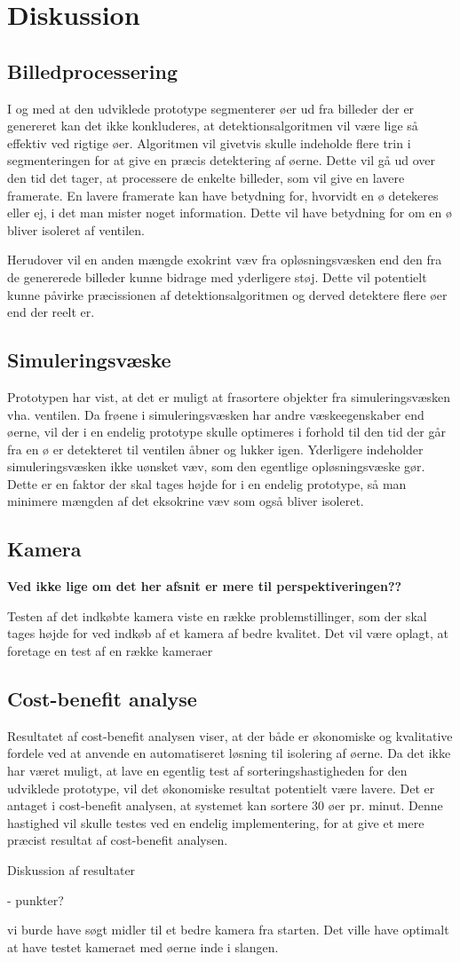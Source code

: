 \chapter{Diskussion}

\section{Billedprocessering}
I og med at den udviklede prototype segmenterer øer ud fra billeder der er genereret kan det ikke konkluderes, at detektionsalgoritmen vil være lige så effektiv ved rigtige øer. Algoritmen vil givetvis skulle indeholde flere trin i segmenteringen for at give en præcis detektering af øerne. Dette vil gå ud over den tid det tager, at processere de enkelte billeder, som vil give en lavere framerate. En lavere framerate kan have betydning for, hvorvidt en ø detekeres eller ej, i det man mister noget information. Dette vil have betydning for om en ø bliver isoleret af ventilen.

Herudover vil en anden mængde exokrint væv fra opløsningsvæsken end den fra de genererede billeder kunne bidrage med yderligere støj. Dette vil potentielt kunne påvirke præcissionen af detektionsalgoritmen og derved detektere flere øer end der reelt er. 
\section{Simuleringsvæske}
Prototypen har vist, at det er muligt at frasortere objekter fra simuleringsvæsken vha. ventilen. Da frøene i simuleringsvæsken har andre væskeegenskaber end øerne, vil der i en endelig prototype skulle optimeres i forhold til den tid der går fra en ø er detekteret til ventilen åbner og lukker igen. Yderligere indeholder simuleringsvæsken ikke uønsket væv, som den egentlige opløsningsvæske gør. Dette er en faktor der skal tages højde for i en endelig prototype, så man minimere mængden af det eksokrine væv som også bliver isoleret.

\section{Kamera}
\textbf{Ved ikke lige om det her afsnit er mere til perspektiveringen??}

Testen af det indkøbte kamera viste en række problemstillinger, som der skal tages højde for ved indkøb af et kamera af bedre kvalitet. Det vil være oplagt, at foretage en test af en række kameraer
\section{Cost-benefit analyse}
Resultatet af cost-benefit analysen viser, at der både er økonomiske og kvalitative fordele ved at anvende en automatiseret løsning til isolering af øerne. Da det ikke har været muligt, at lave en egentlig test af sorteringshastigheden for den udviklede prototype, vil det økonomiske resultat potentielt være lavere. Det er antaget i cost-benefit analysen, at systemet kan sortere 30 øer pr. minut. Denne hastighed vil skulle testes ved en endelig implementering, for at give et mere præcist resultat af cost-benefit analysen. 


Diskussion af resultater

- punkter?

vi burde have søgt midler til et bedre kamera fra starten. Det ville have optimalt at have testet kameraet med øerne inde i slangen. 

